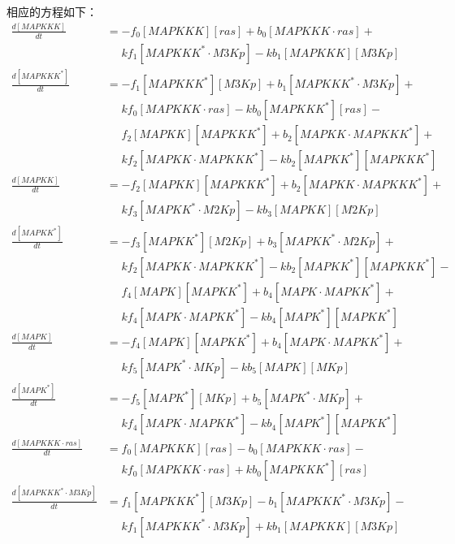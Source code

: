 相应的方程如下：
\small
\begin{equation*}
  \begin{align*}
    \frac{d[MAPKKK]}{dt} &= -f_{0}[MAPKKK][ras] + b_{0}[MAPKKK\cdot{}ras] +\\
    &\phantom{=} kf_{1}[MAPKKK^{*}\cdot{}M3Kp] - kb_{1}[MAPKKK][M3Kp]\\
    \frac{d[MAPKKK^{*}]}{dt} &= -f_{1}[MAPKKK^{*}][M3Kp] + b_{1}[MAPKKK^{*}\cdot{}M3Kp] +\\
    &\phantom{=} kf_{0}[MAPKKK\cdot{}ras] - kb_{0}[MAPKKK^{*}][ras] -\\
    &\phantom{=} f_{2}[MAPKK][MAPKKK^{*}] + b_{2}[MAPKK\cdot{}MAPKKK^{*}] +\\
    &\phantom{=} kf_{2}[MAPKK\cdot{}MAPKKK^{*}] - kb_{2}[MAPKK^{*}][MAPKKK^{*}]\\
    \frac{d[MAPKK]}{dt} &= -f_{2}[MAPKK][MAPKKK^{*}] + b_{2}[MAPKK\cdot{}MAPKKK^{*}] +\\
    &\phantom{=} kf_{3}[MAPKK^{*}\cdot{}M2Kp] - kb_{3}[MAPKK][M2Kp]\\
    \frac{d[MAPKK^{*}]}{dt} &= -f_{3}[MAPKK^{*}][M2Kp] + b_{3}[MAPKK^{*}\cdot{}M2Kp] +\\
    &\phantom{=} kf_{2}[MAPKK\cdot{}MAPKKK^{*}] - kb_{2}[MAPKK^{*}][MAPKKK^{*}] -\\
    &\phantom{=} f_{4}[MAPK][MAPKK^{*}] + b_{4}[MAPK\cdot{}MAPKK^{*}] +\\
    &\phantom{=} kf_{4}[MAPK\cdot{}MAPKK^{*}] - kb_{4}[MAPK^{*}][MAPKK^{*}]\\
    \frac{d[MAPK]}{dt} &= -f_{4}[MAPK][MAPKK^{*}] + b_{4}[MAPK\cdot{}MAPKK^{*}] +\\
    &\phantom{=} kf_{5}[MAPK^{*}\cdot{}MKp] - kb_{5}[MAPK][MKp]\\ 
    \frac{d[MAPK^{*}]}{dt} &= -f_{5}[MAPK^{*}][MKp] + b_{5}[MAPK^{*}\cdot{}MKp] +\\
    &\phantom{=} kf_{4}[MAPK\cdot{}MAPKK^{*}] - kb_{4}[MAPK^{*}][MAPKK^{*}]\\ 
    \frac{d[MAPKKK\cdot{}ras]}{dt} &= f_{0}[MAPKKK][ras] - b_{0}[MAPKKK\cdot{}ras] -\\
    &\phantom{=} kf_{0}[MAPKKK\cdot{}ras] + kb_{0}[MAPKKK^{*}][ras]\\
    \frac{d[MAPKKK^{*}\cdot{}M3Kp]}{dt} &= f_{1}[MAPKKK^{*}][M3Kp] - b_{1}[MAPKKK^{*}\cdot{}M3Kp] -\\
    &\phantom{=} kf_{1}[MAPKKK^{*}\cdot{}M3Kp] + kb_{1}[MAPKKK][M3Kp]\\

\end{align*}
\end{equation*}
